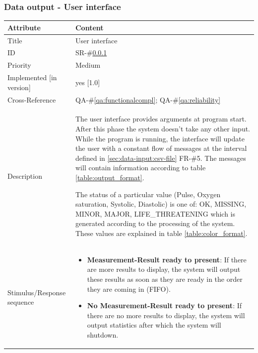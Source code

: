 \documentclass[a4paper]{article}
\begin{document}


\clearpage
\subsubsection{Data output - User interface}
\label{ftr:ui}
\renewcommand*{\arraystretch}{1.4}
\begin{longtable}[l]{ | >{\columncolor{vu-grey-50}}m{110pt} | m{300pt} | }

    \hline
    \rowcolor{vu-blue}
    \textcolor{vu-white}{\textbf{Attribute}} & \textcolor{vu-white}{\textbf{Content}}
    \\ \hline
    
    Title &
    User interface
    \\ \hline
    
    ID &
    SR-\#\ref{ftr:ui}
    \\ \hline
    
    Priority &
    Medium
    \\ \hline
    
    Implemented [in version] &
    yes [1.0]
    \\ \hline
    
    Cross-Reference &
    QA-\#\ref{qa:functionalcompl}; QA-\#\ref{qa:reliability}
    \\ \hline
    
    Description &
    The user interface provides arguments at program start. After this phase the system doesn't take any other input. While the program is running, the interface will update the user with a constant flow of messages at the interval defined in \ref{sec:data-input:csv-file} FR-\#5. The messages will contain information according to table \ref{table:output_format}.
    
    The status of a particular value (Pulse, Oxygen saturation, Systolic, Diastolic) is one of: OK, MISSING, MINOR, MAJOR, LIFE\_THREATENING which is generated according to the processing of the system. These values are explained in table \ref{table:color_format}.
    \\ \hline
    
    Stimulus/Response sequence &
    \begin{itemize}
        \item \textbf{Measurement-Result ready to present}: If there are more results to display, the system will output these results as soon as they are ready in the order they are coming in (FIFO).
        \item \textbf{No Measurement-Result ready to present}: If there are no more results to display, the system will output statistics after which the system will shutdown.
    \end{itemize}
    \\ \hline
    

\end{longtable}
\end{document}
